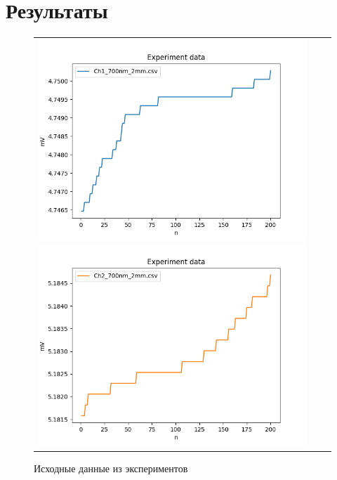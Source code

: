 \documentclass[a4paper,14pt]{article}
\begin{document}
	\section{Результаты}
	\begin{figure}[H]
		\begin{tabular}{ccc}
			\includegraphics[scale=0.5]{../image/input_PR1.png}
			\includegraphics[scale=0.5]{../image/input_PR2.png}
		\end{tabular}
		\caption{Исходные данные из экспериментов} 
	\end{figure}
	
\end{document}
